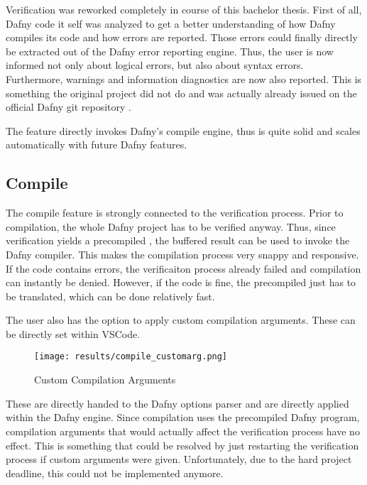 Verification was reworked completely in course of this bachelor thesis.
First of all, Dafny code it self was analyzed to get a better understanding of how Dafny compiles its code and how errors are reported.
Those errors could finally directly be extracted out of the Dafny error reporting engine.
Thus, the user is now informed not only about logical errors, but also about syntax errors.
Furthermore, warnings and information diagnostics are now also reported.
This is something the original project \cite{ba} did not do and was actually already issued on the official Dafny git repository \cite{dafny_noWarnings}.

The feature directly invokes Dafny's compile engine, thus is quite solid and scales automatically with future Dafny features.



\subsection{Compile}
The compile feature is strongly connected to the verification process.
Prior to compilation, the whole Dafny project has to be verified anyway.
Thus, since verification yields a precompiled , the buffered result can be used to invoke the Dafny compiler.
This makes the compilation process very snappy and responsive.
If the code contains errors, the verificaiton process already failed and compilation can instantly be denied.
However, if the code is fine, the precompiled  just has to be translated, which can be done relatively fast.

The user also has the option to apply custom compilation arguments.
These can be directly set within VSCode.
\begin{figure}[H]
    \centering
    \texttt{[image: results/compile\_customarg.png]}
    \caption{Custom Compilation Arguments}
    \label{fig:compilation_custom_args}
\end{figure}

These are directly handed to the Dafny options parser and are directly applied within the Dafny engine.
Since compilation uses the precompiled Dafny program, compilation arguments that would actually affect the verification process have no effect.
This is something that could be resolved by just restarting the verification process if custom arguments were given.
Unfortunately, due to the hard project deadline, this could not be implemented anymore.

